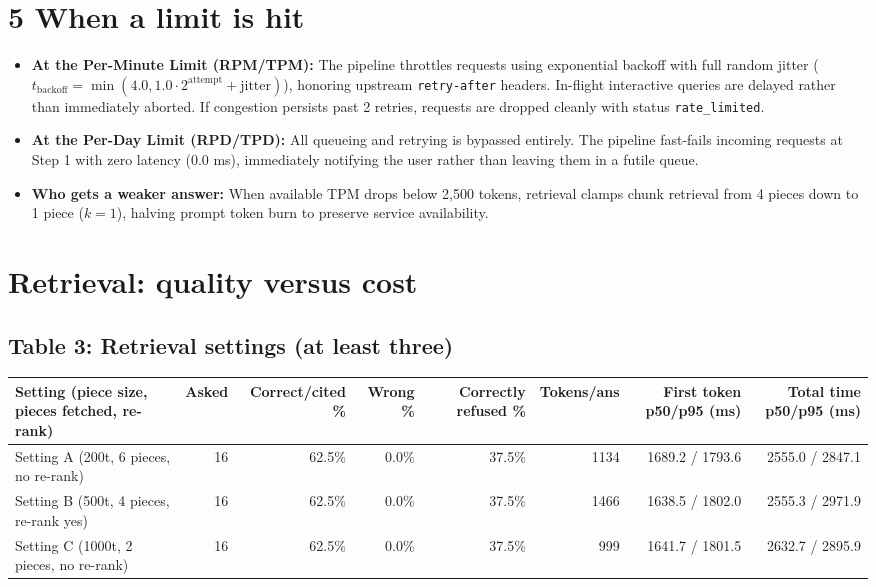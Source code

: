 \documentclass[9pt,a4paper]{article}
\begin{document}
\section*{5 When a limit is hit}
\begin{itemize}
    \item \textbf{At the Per-Minute Limit (RPM/TPM):} The pipeline throttles requests using exponential backoff with full random jitter ($t_{\text{backoff}} = \min(4.0, 1.0 \cdot 2^{\text{attempt}} + \text{jitter})$), honoring upstream \texttt{retry-after} headers. In-flight interactive queries are delayed rather than immediately aborted. If congestion persists past 2 retries, requests are dropped cleanly with status \texttt{rate\_limited}.
    \item \textbf{At the Per-Day Limit (RPD/TPD):} All queueing and retrying is bypassed entirely. The pipeline fast-fails incoming requests at Step 1 with zero latency (0.0 ms), immediately notifying the user rather than leaving them in a futile queue.
    \item \textbf{Who gets a weaker answer:} When available TPM drops below 2,500 tokens, retrieval clamps chunk retrieval from 4 pieces down to 1 piece ($k=1$), halving prompt token burn to preserve service availability.
\end{itemize}

\section*{Retrieval: quality versus cost}

\subsection*{Table 3: Retrieval settings (at least three)}
\noindent\begin{tabularx}{\textwidth}{l r r r r r r r}
\toprule
\textbf{Setting (piece size, pieces fetched, re-rank)} & \textbf{Asked} & \textbf{Correct/cited \%} & \textbf{Wrong \%} & \textbf{Correctly refused \%} & \textbf{Tokens/ans} & \textbf{First token p50/p95 (ms)} & \textbf{Total time p50/p95 (ms)} \\
\midrule
Setting A (200t, 6 pieces, no re-rank) & 16 & 62.5\% & 0.0\% & 37.5\% & 1134 & 1689.2 / 1793.6 & 2555.0 / 2847.1 \\
Setting B (500t, 4 pieces, re-rank yes) & 16 & 62.5\% & 0.0\% & 37.5\% & 1466 & 1638.5 / 1802.0 & 2555.3 / 2971.9 \\
Setting C (1000t, 2 pieces, no re-rank) & 16 & 62.5\% & 0.0\% & 37.5\% & 999 & 1641.7 / 1801.5 & 2632.7 / 2895.9 \\
\bottomrule
\end{tabularx}
\end{document}
